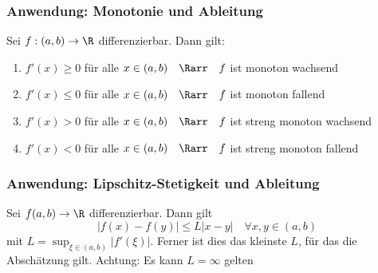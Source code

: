		\subsubsection{Anwendung: Monotonie und Ableitung}
			\begin{Satz} [ ]
				Sei $f: (a, b)\to\R$ differenzierbar. Dann gilt:
				\begin{enumerate}
					\item $f'(x)\geq 0$ für alle $x\in(a, b) \quad \Rarr \quad f$ ist monoton wachsend
					\item $f'(x)\leq 0$ für alle $x\in(a, b) \quad \Rarr \quad f$ ist monoton fallend
					\item $f'(x) > 0$ für alle $x\in(a, b) \quad \Rarr \quad f$ ist streng monoton wachsend
					\item $f'(x) < 0$ für alle $x\in(a, b) \quad \Rarr \quad f$ ist streng monoton fallend
				\end{enumerate}
			\end{Satz}
		\subsubsection{Anwendung: Lipschitz-Stetigkeit und Ableitung}
			\begin{Satz} [ ]
				Sei $f(a, b)\to\R$ differenzierbar. Dann gilt
				$$
					|f(x)-f(y)|\leq L|x-y| \quad \forall x, y\in(a, b)
				$$
				mit $L=\sup_{\xi\in(a, b)}|f'(\xi)|$. Ferner ist dies das kleinste $L$, für das die Abschätzung gilt. Achtung: Es kann $L=\infty$ gelten
			\end{Satz}